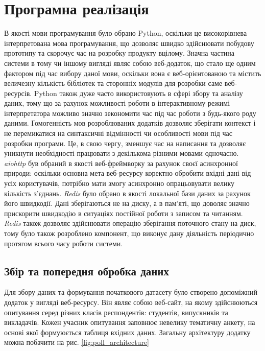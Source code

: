 \section{Програмна реалізація}
В якості мови програмування було обрано Python, оскільки це високорівнева інтерпретована мова програмування, що дозволяє швидко здійснювати побудову прототипу та скорочує час на розробку продукту вцілому. Значна частина системи в тому чи іншому вигляді являє собою веб-додаток, що стало ще одним фактором під час вибору даної мови, оскільки вона є веб-орієнтованою та містить величезну кількість бібліотек та сторонніх модулів для розробки саме веб-ресурсів. Python також дуже часто використовують в сфері збору та аналізу даних, тому що за рахунок можливості роботи в інтерактивному режимі інтерпретатора можливо значно зекономити час під час роботи з будь-якого роду даними. Гомогенність мов розроблюваних додатків дозволяє зберігати контекст і не перемикатися на синтаксичні відмінності чи особливості мови під час розробки програми. Це, в свою чергу, зменшує час на написання та дозволяє уникнути необхідності працювати з декількома різними мовами одночасно.
\textit{aiohttp} був обраний в якості веб-фреймворку за рахунок своєї асинхронної природи: оскільки основна мета веб-ресурсу коректно обробити вхідні дані від усіх користувачів, потрібно мати змогу асинхронно опрацьовувати велику кількість з'єднань. \textit{Redis} було обрано в якості локальної бази даних за рахунок його швидкодії. Дані зберігаються не на диску, а в пам'яті, що доволяє значно прискорити швидкодію в ситуаціях постійної роботи з записом та читанням. \textit{Redis} також дозволяє здійснювати операцію зберігання поточного стану на диск, тому було також розроблено компонент, що виконує дану діяльність періодично протягом всього часу роботи системи.

\subsection{Збір та попередня обробка даних}
Для збору даних та формування початкового датасету було створено допоміжний додаток у вигляді веб-ресурсу. Він являє собою веб-сайт, на якому здійснюються опитування серед різних класів респондентів: студентів, випускників та викладачів. Кожен учасник опитування заповнює невелику тематичну анкету, на основі якої формуюється таблиця вхідних даних. Загальну архітектуру додатку можна побачити на рис. \ref{fig:poll_architecture} 

